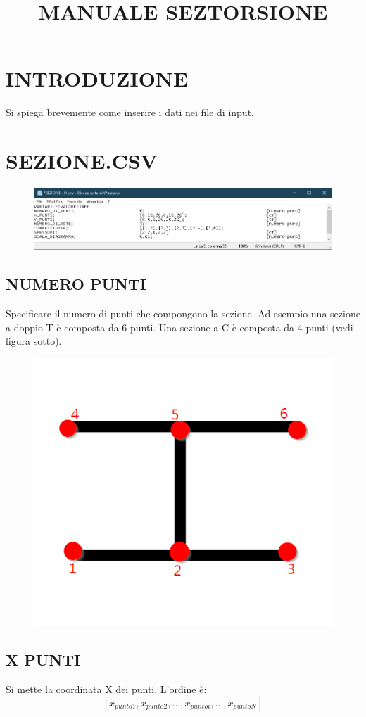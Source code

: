 \documentclass[12pt  , a4, titlepage]{article}
\title{MANUALE SEZTORSIONE}
\date{}
\begin{document}
	\maketitle

	\section*{INTRODUZIONE}
	Si spiega brevemente come inserire i dati nei file di input.
	
	\section*{SEZIONE.CSV}
	\begin{figure}[h!]
		\centering
		\includegraphics[width=\linewidth]{FIGURE/SEZIONE_TOT}
		\caption{}
		\label{fig:sezionetot}
	\end{figure}
	\subsection*{NUMERO PUNTI}
	Specificare il numero di punti che compongono la sezione. Ad esempio una sezione a doppio T è composta da 6 punti. Una sezione a C è composta da 4 punti (vedi figura sotto).
	
		\begin{figure}[h!]
		\centering
		\includegraphics[width=0.5\linewidth]{FIGURE/NUM_NODI}
		\caption{}
		\label{fig:NUM_NODI}
	\end{figure}

\subsection*{X PUNTI}
	Si mette la coordinata X dei punti. L'ordine è:
	\[
	[x_{punto1}, x_{punto2}, \dots , x_{punto i} , \dots, x_{puntoN}]
	\]
\end{document}
